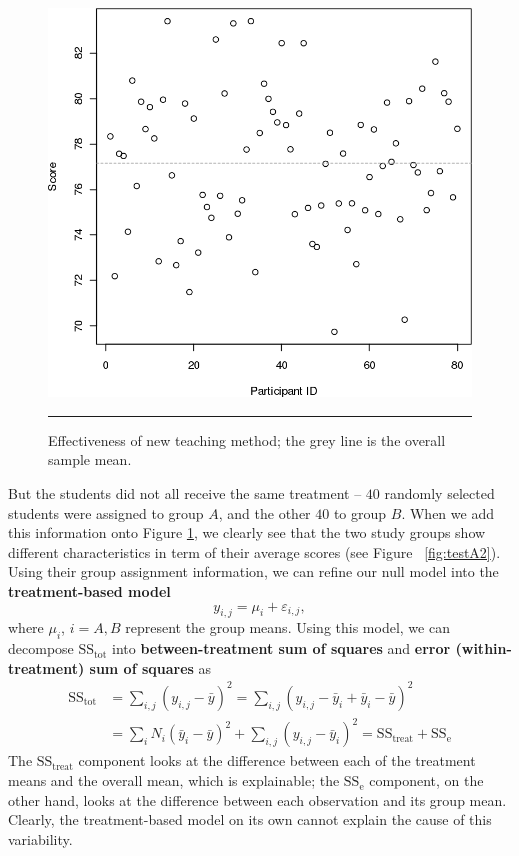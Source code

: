 \begin{figure}[!t]
\centering
  \includegraphics[width=0.5\linewidth]{images/SA/testA1.png}
  \caption[\small Effectiveness of new teaching method]{\small Effectiveness of new teaching method; the grey line is the overall sample mean.}
  \label{fig:testA1} \hrule
\end{figure}
\newpage\noindent But the students did not all receive the same treatment -- $40$ randomly selected students were assigned to group $A$, and the other $40$ to group $B$. When we add this information onto Figure \ref{fig:testA1}, we clearly see that the two study groups show different characteristics in term of their average scores (see Figure~ \ref{fig:testA2}). Using their group assignment information, we can refine our null model into the  \textbf{treatment-based model}
\begin{equation*}%
    y_{i,j}=\mu_{i}+\varepsilon_{i,j},
\end{equation*}
where $\mu_i$, $i={A,B}$ represent the group means. Using this model, we can decompose $\text{SS}_{\textrm{tot}}$ into \textbf{between-treatment sum of squares} and \textbf{error (within-treatment) sum of squares} as
\begin{align*}
   \text{SS}_{\textrm{tot}}&=\sum_{i,j}(y_{i,j}-\bar{y})^{2}=\sum_{i,j}(y_{i,j}-\bar{y}_{i}+\bar{y}_{i}-\bar{y})^{2}\\
    &=\sum_{i}N_{i}(\bar{y}_{i}-\bar{y})^{2}+\sum_{i,j}(y_{i,j}-\bar{y}_{i})^2=\text{SS}_{\textrm{treat}}+\text{SS}_{\textrm{e}}
\end{align*}
The $\text{SS}_{\textrm{treat}}$ component looks at the difference between each of the treatment means and the overall mean, which is explainable; the $\text{SS}_{\textrm{e}}$ component, on the other hand, looks at the difference between each observation and its group mean. Clearly, the treatment-based model on its own cannot explain the cause of this variability. 

